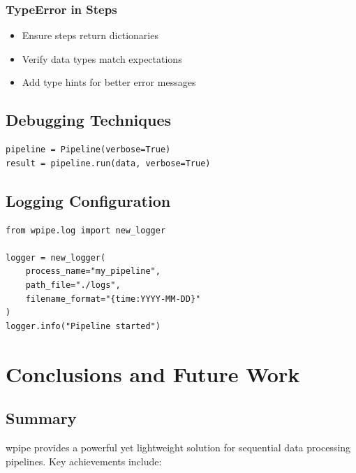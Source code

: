 \documentclass[12pt,a4paper]{report}
\begin{document}
\subsection{TypeError in Steps}

\begin{itemize}
    \item Ensure steps return dictionaries
    \item Verify data types match expectations
    \item Add type hints for better error messages
\end{itemize}

\section{Debugging Techniques}

\begin{lstlisting}[caption={Verbose Output}, label={lst:debug}]
pipeline = Pipeline(verbose=True)
result = pipeline.run(data, verbose=True)
\end{lstlisting}

\section{Logging Configuration}

\begin{lstlisting}[caption={Logging Setup}, label={lst:logging}]
from wpipe.log import new_logger

logger = new_logger(
    process_name="my_pipeline",
    path_file="./logs",
    filename_format="{time:YYYY-MM-DD}"
)
logger.info("Pipeline started")
\end{lstlisting}

\chapter{Conclusions and Future Work}
\cleardoublepage

\section{Summary}

wpipe provides a powerful yet lightweight solution for sequential data processing pipelines. Key achievements include:
\end{document}
